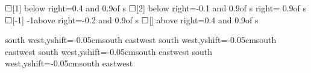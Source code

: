 \begin{scope}[new]
    {☐[1]}
    {}{below right=0.4 and 0.9of s}{}
    {☐[2]}
    {}{below right=-0.1 and 0.9of s}{}
    {}
    {}{right= 0.9of s}{}
    {☐[-1]}
    {-1}{above right=-0.2 and 0.9of s}{}
    {☐[]}
    {}{above right=0.4 and 0.9of s}{}

    {\shaftDefinitionSidePortIcon\shaftDefinitionDoorNumberPortIcon}
    {}{}{south west,yshift=-0.05cm}{south east}{west}
    {\shaftDefinitionSidePortIcon\shaftDefinitionDoorNumberPortIcon}
    {}{}{south west,yshift=-0.05cm}{south east}{west}
    {\shaftDefinitionSidePortIcon\shaftDefinitionDoorNumberPortIcon}
    {}{}{south west,yshift=-0.05cm}{south east}{west}
    {\shaftDefinitionSidePortIcon\shaftDefinitionDoorNumberPortIcon}
    {}{}{south west,yshift=-0.05cm}{south east}{west}
\end{scope}

